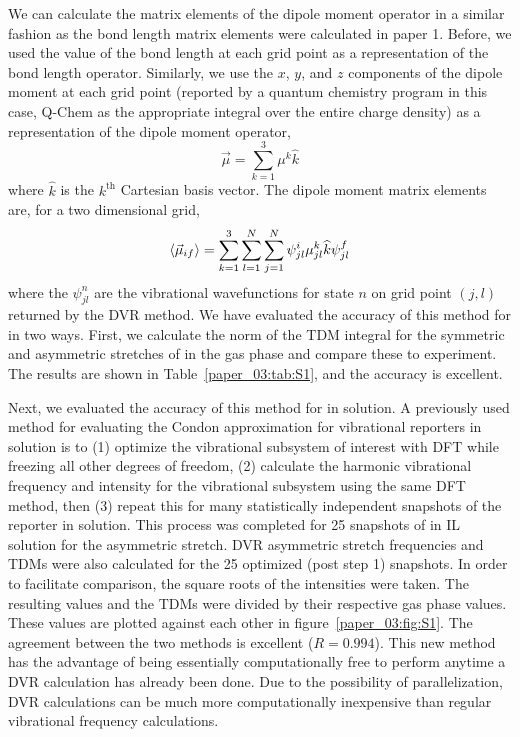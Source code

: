 \documentclass[%
  class = book,%
  crop = false,%
  float = true,%
  multi = true,%
  preview = false,%
]{standalone}
\let\cite\autocite
\begin{document}
We can calculate the matrix elements of the dipole moment operator in a similar fashion as the bond length matrix elements were calculated in paper 1. Before, we used the value of the bond length at each grid point as a representation of the bond length operator. Similarly, we use the \(x\), \(y\), and \(z\) components of the dipole moment at each grid point (reported by a quantum chemistry program \textemdash{} in this case, Q-Chem\cite{Shao2015} \textemdash{} as the appropriate integral over the entire charge density) as a representation of the dipole moment operator,
\begin{equation}
  \label{paper_03:eq:S2}
  \vec{\mu} = \sum_{k = 1}^{3} \mu^k \widehat{k}
\end{equation}
where \(\widehat{k}\) is the \(k^{\text{th}}\) Cartesian basis vector. The dipole moment matrix elements are, for a two dimensional grid,
\begin{equation}
  \label{paper_03:eq:S3}
  \Braket{ \vec{\mu}_{if} } = \sum_{k = 1}^{3} \sum_{l = 1}^{N} \sum_{j = 1}^{N} \psi_{jl}^{i} \mu_{jl}^{k} \widehat{k} \psi_{jl}^{f}
\end{equation}
where the \(\psi_{jl}^{n}\) are the vibrational wavefunctions for state \(n\) on grid point \((j,l)\) returned by the DVR method. We have evaluated the accuracy of this method for  in two ways. First, we calculate the norm of the TDM integral for the symmetric and asymmetric stretches of  in the gas phase and compare these to experiment.\cite{DOWNING197566} The results are shown in Table~\ref{paper_03:tab:S1}, and the accuracy is excellent.

Next, we evaluated the accuracy of this method for  in solution. A previously used method for evaluating the Condon approximation for vibrational reporters in solution is to (1) optimize the vibrational subsystem of interest with DFT while freezing all other degrees of freedom, (2) calculate the harmonic vibrational frequency and intensity for the vibrational subsystem using the same DFT method, then (3) repeat this for many statistically independent snapshots of the reporter in solution.\cite{schmidt_pronounced_2005-1} This process was completed for \num{25} snapshots of  in IL solution for the asymmetric stretch. DVR asymmetric stretch frequencies and TDMs were also calculated for the \num{25} optimized (post step 1) snapshots. In order to facilitate comparison, the square roots of the intensities were taken. The resulting values and the TDMs were divided by their respective gas phase values. These values are plotted against each other in figure~\ref{paper_03:fig:S1}. The agreement between the two methods is excellent (\(R = 0.994\)). This new method has the advantage of being essentially computationally free to perform anytime a DVR calculation has already been done. Due to the possibility of parallelization, DVR calculations can be much more computationally inexpensive than regular vibrational frequency calculations.
\end{document}
